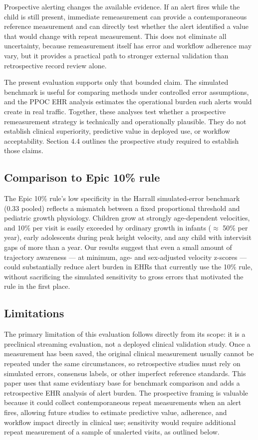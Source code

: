 \documentclass[11pt]{article}
\begin{document}
Prospective alerting changes the available evidence. If an alert fires while the child is still present, immediate remeasurement can provide a contemporaneous reference measurement and can directly test whether the alert identified a value that would change with repeat measurement. This does not eliminate all uncertainty, because remeasurement itself has error and workflow adherence may vary, but it provides a practical path to stronger external validation than retrospective record review alone.

The present evaluation supports only that bounded claim. The simulated benchmark is useful for comparing methods under controlled error assumptions, and the PPOC EHR analysis estimates the operational burden such alerts would create in real traffic. Together, these analyses test whether a prospective remeasurement strategy is technically and operationally plausible. They do not establish clinical superiority, predictive value in deployed use, or workflow acceptability. Section 4.4 outlines the prospective study required to establish those claims.

\subsection{Comparison to Epic 10\% rule}\label{comparison-to-epic-10-rule}

The Epic 10\% rule's low specificity in the Harrall simulated-error benchmark (0.33 pooled) reflects a mismatch between a fixed proportional threshold and pediatric growth physiology. Children grow at strongly age-dependent velocities, and 10\% per visit is easily exceeded by ordinary growth in infants (\(\approx\) 50\% per year), early adolescents during peak height velocity, and any child with intervisit gaps of more than a year. Our results suggest that even a small amount of trajectory awareness --- at minimum, age- and sex-adjusted velocity z-scores --- could substantially reduce alert burden in EHRs that currently use the 10\% rule, without sacrificing the simulated sensitivity to gross errors that motivated the rule in the first place.

\subsection{Limitations}\label{limitations}

The primary limitation of this evaluation follows directly from its scope: it is a preclinical streaming evaluation, not a deployed clinical validation study. Once a measurement has been saved, the original clinical measurement usually cannot be repeated under the same circumstances, so retrospective studies must rely on simulated errors, consensus labels, or other imperfect reference standards. This paper uses that same evidentiary base for benchmark comparison and adds a retrospective EHR analysis of alert burden. The prospective framing is valuable because it could collect contemporaneous repeat measurements when an alert fires, allowing future studies to estimate predictive value, adherence, and workflow impact directly in clinical use; sensitivity would require additional repeat measurement of a sample of unalerted visits, as outlined below.
\end{document}
